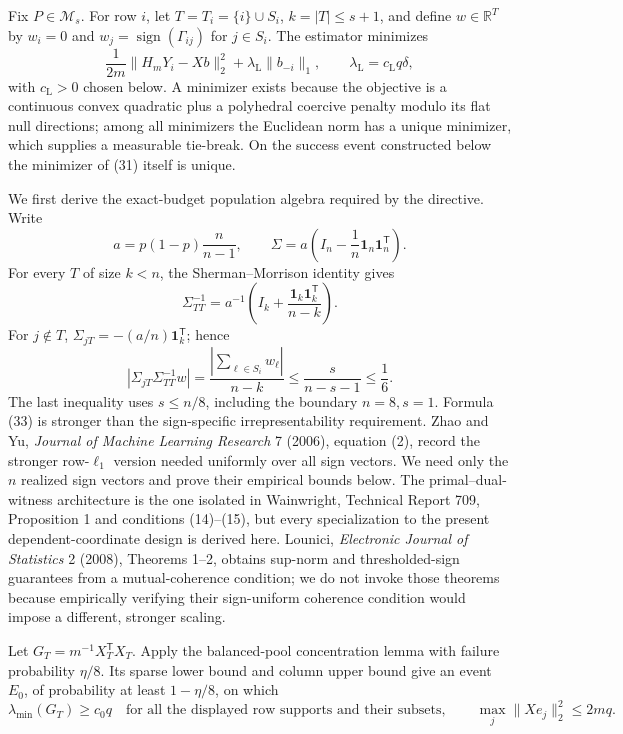 Fix \(P\in\mathcal M_s\).  For row \(i\), let \(T=T_i=\{i\}\cup S_i\), \(k=|T|\le s+1\), and define \(w\in\mathbb R^T\) by \(w_i=0\) and \(w_j=\operatorname{sign}(\Gamma_{ij})\) for \(j\in S_i\).  The estimator minimizes
\[
 \frac1{2m}\lVert H_mY_i-Xb\rVert_2^2
 +\lambda_{\mathrm L}\lVert b_{-i}\rVert_1,
 \qquad \lambda_{\mathrm L}=c_{\mathrm L}q\delta,
 \tag{31}
\]
with \(c_{\mathrm L}>0\) chosen below.  A minimizer exists because the objective is a continuous convex quadratic plus a polyhedral coercive penalty modulo its flat null directions; among all minimizers the Euclidean norm has a unique minimizer, which supplies a measurable tie-break.  On the success event constructed below the minimizer of (31) itself is unique.

We first derive the exact-budget population algebra required by the directive.  Write
\[
 a=p(1-p)\frac n{n-1},
 \qquad \Sigma=a\left(I_n-\frac1n\mathbf1_n\mathbf1_n^{\mathsf T}\right).
\]
For every \(T\) of size \(k<n\), the Sherman--Morrison identity gives
\[
 \Sigma_{TT}^{-1}=a^{-1}\left(I_k+\frac{\mathbf1_k\mathbf1_k^{\mathsf T}}{n-k}\right).
 \tag{32}
\]
For \(j\notin T\), \(\Sigma_{jT}=-(a/n)\mathbf1_k^{\mathsf T}\); hence
\[
 \left|\Sigma_{jT}\Sigma_{TT}^{-1}w\right|
 =\frac{|\sum_{\ell\in S_i}w_\ell|}{n-k}
 \le\frac{s}{n-s-1}\le\frac16.
 \tag{33}
\]
The last inequality uses \(s\le n/8\), including the boundary \(n=8,s=1\).  Formula (33) is stronger than the sign-specific irrepresentability requirement.  Zhao and Yu, \emph{Journal of Machine Learning Research} 7 (2006), equation (2), record the stronger row-\(\ell_1\) version needed uniformly over all sign vectors.  We need only the \(n\) realized sign vectors and prove their empirical bounds below.  The primal--dual-witness architecture is the one isolated in Wainwright, Technical Report 709, Proposition 1 and conditions (14)--(15), but every specialization to the present dependent-coordinate design is derived here.  Lounici, \emph{Electronic Journal of Statistics} 2 (2008), Theorems 1--2, obtains sup-norm and thresholded-sign guarantees from a mutual-coherence condition; we do not invoke those theorems because empirically verifying their sign-uniform coherence condition would impose a different, stronger scaling.

Let \(G_T=m^{-1}X_T^{\mathsf T}X_T\).  Apply the balanced-pool concentration lemma with failure probability \(\eta/8\).  Its sparse lower bound and column upper bound give an event \(E_0\), of probability at least \(1-\eta/8\), on which
\[
 \lambda_{\min}(G_T)\ge c_0q
 \quad\text{for all the displayed row supports and their subsets},
 \qquad \max_j\lVert Xe_j\rVert_2^2\le2mq.
 \tag{34}
\]


